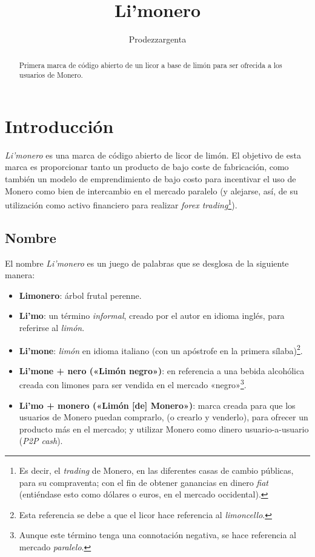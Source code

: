 \documentclass[12pt,a4paper]{article}
\author{Prodezzargenta}
\title{Li'monero}
\begin{document}
\maketitle

\begin{abstract}
Primera marca de código abierto de un licor a base de limón para ser ofrecida a los usuarios de Monero.
\end{abstract}

\tableofcontents

\section{Introducción}
\textit{Li'monero} es una marca de código abierto de licor de limón. El objetivo de esta marca es proporcionar tanto un producto de bajo coste de fabricación, como también un modelo de emprendimiento de bajo costo para incentivar el uso de Monero como bien de intercambio en el mercado paralelo (y alejarse, así, de su utilización como activo financiero para realizar \textit{forex trading}\footnote{Es decir, el \textit{trading} de Monero, en las diferentes casas de cambio públicas, para su compraventa; con el fin de obtener ganancias en dinero \textit{fiat} (entiéndase esto como dólares o euros, en el mercado occidental).}).

\subsection{Nombre}
El nombre \textit{Li'monero} es un juego de palabras que se desglosa de la siguiente manera: 

\begin{itemize}
\item \textbf{Limonero}: árbol frutal perenne.
\item \textbf{Li'mo}: un término \textit{informal}, creado por el autor en idioma inglés, para referirse al \textit{limón}.
\item \textbf{Li'mone}: \textit{limón} en idioma italiano (con un apóstrofe en la primera sílaba)\footnote{Esta referencia se debe a que el licor hace referencia al \textit{limoncello}.}.
\item \textbf{Li'mone + nero («Limón negro»)}: en referencia a una bebida alcohólica creada con limones para ser vendida en el mercado «negro»\footnote{Aunque este término tenga una connotación negativa, se hace referencia al mercado \textit{paralelo}.}.
\item \textbf{Li'mo + monero («Limón [de] Monero»)}: marca creada para que los usuarios de Monero puedan comprarlo, (o crearlo y venderlo), para ofrecer un producto más en el mercado; y utilizar Monero como dinero usuario-a-usuario (\textit{P2P cash}).
\end{itemize}
\end{document}
